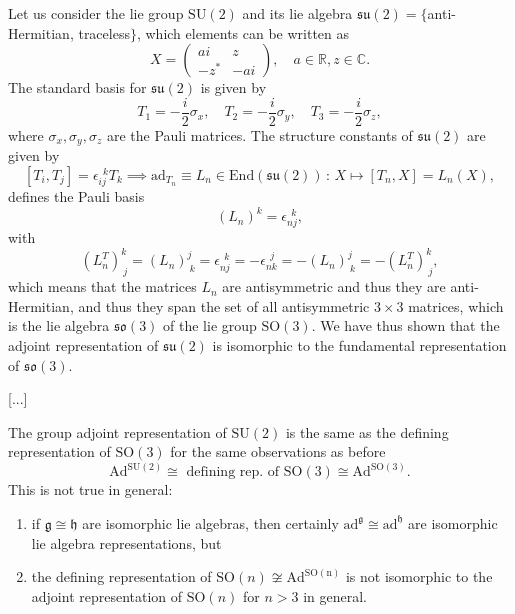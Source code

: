 \begin{example}
    Let us consider the lie group \(\mathrm{SU}(2)\) and its lie algebra \(\mathfrak{su}(2) = \{\)anti-Hermitian, traceless\(\}\), which elements can be written as
    \[
        X = \begin{pmatrix}
            ai   & z   \\
            -z^* & -ai
        \end{pmatrix}, \quad a \in \mathbb{R}, z \in \mathbb{C}.
    \]
    The standard basis for \(\mathfrak{su}(2)\) is given by
    \[
        T_1 = -\frac{i}{2} \sigma_x, \quad T_2 = -\frac{i}{2} \sigma_y, \quad T_3 = -\frac{i}{2} \sigma_z,
    \]
    where \(\sigma_x, \sigma_y, \sigma_z\) are the Pauli matrices. The structure constants of \(\mathfrak{su}(2)\) are given by
    \[
        [T_i, T_j] = \epsilon_{ij}^{\ \ k} T_k \implies \mathrm{ad}_{T_n} \equiv L_n \in \mathrm{End}(\mathfrak{su}(2)) \,:\, X \mapsto [T_n, X] = L_n(X),
    \]
    defines the Pauli basis
    \[
        (L_n)^k = \epsilon_{nj}^{\ \ k},
    \]
    with 
    \[
        (L_n^T)^k_{\ j} = (L_n)^j_{\ k} = \epsilon_{nj}^{\ \ k} = -\epsilon_{nk}^{\ \ j} = -(L_n)^j_{\ k} = -(L_n^T)^k_{\ j},
    \]
    which means that the matrices \(L_n\) are antisymmetric and thus they are anti-Hermitian, and thus they span the set of all antisymmetric \(3 \times 3\) matrices, which is the lie algebra \(\mathfrak{so}(3)\) of the lie group \(\mathrm{SO}(3)\). We have thus shown that the adjoint representation of \(\mathfrak{su}(2)\) is isomorphic to the fundamental representation of \(\mathfrak{so}(3)\).

        [...]

    The group adjoint representation of \(\mathrm{SU}(2)\) is the same as the defining representation of \(\mathrm{SO}(3)\) for the same observations as before
    \[
        \mathrm{Ad}^{\mathrm{SU}(2)} \cong \text{ defining rep. of } \mathrm{SO}(3) \cong \mathrm{Ad}^{\mathrm{SO}(3)}.
    \]
    This is not true in general:
    \begin{enumerate}
        \item if \(\mathfrak{g} \cong \mathfrak{h}\) are isomorphic lie algebras, then certainly \(\mathrm{ad}^{\mathfrak{g}} \cong \mathrm{ad}^{\mathfrak{h}}\) are isomorphic lie algebra representations, but
        \item the defining representation of \(\mathrm{SO}(n) \not\cong \mathrm{Ad^{\mathrm{SO}(n)}} \) is not isomorphic to the adjoint representation of \(\mathrm{SO}(n)\) for \(n > 3\) in general.
    \end{enumerate}
\end{example}

